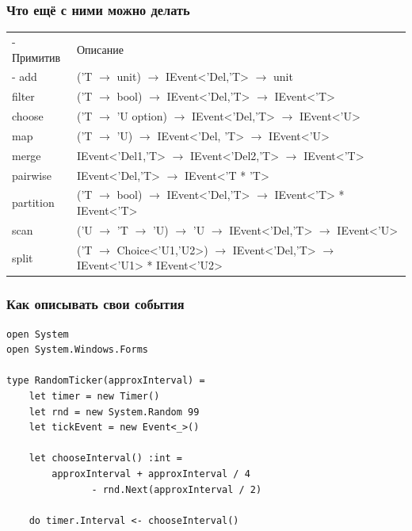\documentclass[xetex,mathserif,serif]{beamer}
\begin{document}
	\begin{frame}
		\frametitle{Что ещё с ними можно делать}
		\begin{footnotesize}
			\begin{tabu} {| X[0.3 l p] | X[1 l p] |}
				\tabucline-
				Примитив  & Описание           \\
				\tabucline-
				\everyrow{\tabucline-}
				add       & ('T $\to$ unit) $\to$ IEvent<'Del,'T> $\to$ unit                                 \\
				filter    & ('T $\to$ bool) $\to$ IEvent<'Del,'T> $\to$ IEvent<'T>                           \\
				choose    & ('T $\to$ 'U option) $\to$ IEvent<'Del,'T> $\to$ IEvent<'U>                      \\
				map       & ('T $\to$ 'U) $\to$ IEvent<'Del, 'T> $\to$ IEvent<'U>                            \\
				merge     & IEvent<'Del1,'T> $\to$ IEvent<'Del2,'T> $\to$ IEvent<'T>                         \\
				pairwise  & IEvent<'Del,'T> $\to$ IEvent<'T * 'T>                                            \\
				partition & ('T $\to$ bool) $\to$ IEvent<'Del,'T> $\to$ IEvent<'T> * IEvent<'T>              \\
				scan      & ('U $\to$ 'T $\to$ 'U) $\to$ 'U $\to$ IEvent<'Del,'T> $\to$ IEvent<'U>           \\
				split     & ('T $\to$ Choice<'U1,'U2>) $\to$ IEvent<'Del,'T> $\to$ IEvent<'U1> * IEvent<'U2> \\
			\end{tabu}
		\end{footnotesize}
	\end{frame}

	\begin{frame}[fragile]
		\frametitle{Как описывать свои события}
		\begin{verbatim}
open System
open System.Windows.Forms

type RandomTicker(approxInterval) =
    let timer = new Timer()
    let rnd = new System.Random 99
    let tickEvent = new Event<_>()

    let chooseInterval() :int =
        approxInterval + approxInterval / 4
               - rnd.Next(approxInterval / 2)

    do timer.Interval <- chooseInterval()
		\end{verbatim}
\end{frame}
\end{document}
